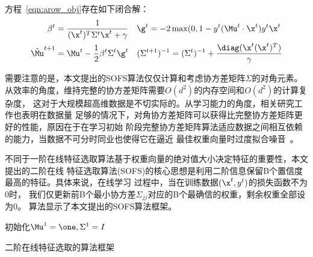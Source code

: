 方程~\eqref{eqn:arow_obj}存在如下闭合解：
\begin{eqnarray}
    \label{equ:arow_solu}
    \beta^t &= \frac{1}{(\x^t)^T\Sigma^{t}\x^t + \gamma} \quad \g^t  =
    -2\max(0, 1 - y^t (\Mu^{t} \cdot \x^t) y^t\x^t \nonumber \\
    \hat{\Mu}^{t+1} &= \Mu^{t} - \frac{1}{2}\beta^t\Sigma^{t}\g^t \quad
    (\Sigma^{t+1})^{-1} = (\Sigma^t)^{-1} + \frac{\diag(\x^t(\x^t)^T)}{\gamma}
\end{eqnarray}

需要注意的是，本文提出的SOFS算法仅仅计算和考虑协方差矩阵$\Sigma$的对角元素。
从效率的角度，维持完整的协方差矩阵需要$O(d^2)$的内存空间和$O(d^2)$的计算复杂度，
这对于大规模超高维数据是不切实际的。从学习能力的角度，相关研究工作也表明在数据量
足够的情况下，对角协方差矩阵可以获得比完整协方差矩阵更好的性能，原因在于在学习初始
阶段完整协方差矩阵算法适应数据之间相互依赖的能力，当数据不可分时同业也使得它在逼近
最佳权重向量时过度拟合噪音~\cite{ma2010exploiting}。

不同于一阶在线特征选取算法基于权重向量的绝对值大小决定特征的重要性，本文提出的二阶在线
特征选取算法(SOFS)的核心思想是利用二阶信息保留B个置信度最高的特征。具体来说，在线学习
过程中，当在训练数据$(\x^t,y^t)$的损失函数不为$0$时，
我们仅更新前B个最小协方差$\Sigma_{jj}$对应的B个最确信的权重，剩余权重全部设为$0$。
算法显示了本文提出的SOFS算法框架。

\IncMargin{1em}
\begin{algorithm}

\BlankLine
初始化$\Mu^1=\one, \Sigma^1 = I$\;
\caption{二阶在线特征选取的算法框架}\label{alg:sofs}
\end{algorithm}\DecMargin{1em}

